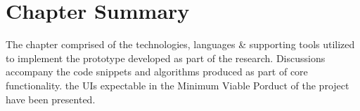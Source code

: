 
\section{Chapter Summary}
The chapter comprised of the technologies, languages \& supporting tools utilized to implement the prototype developed as part of the research. Discussions accompany the code snippets and algorithms produced as part of core functionality. the UIs expectable in the Minimum Viable Porduct of the project have been presented.
